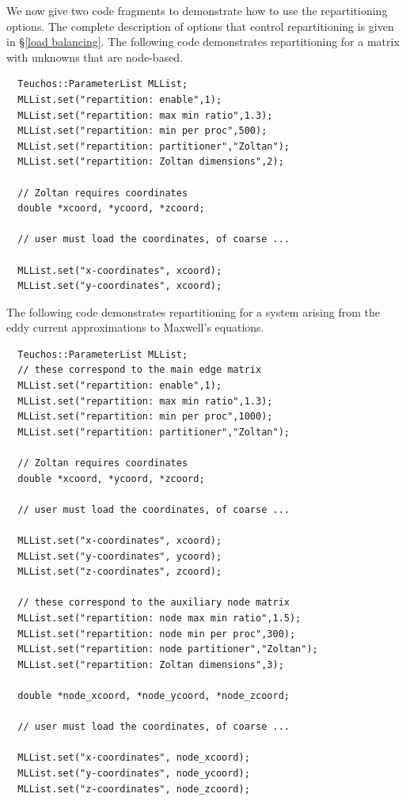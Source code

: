 \documentclass{article}[11pt]
\newcommand{\zoltan}  {{\sc Zoltan}}
\begin{document}
We now give two code fragments to demonstrate how to use the repartitioning
options.
The complete description of options that control repartitioning is given in
\S\ref{load balancing}.
The following code demonstrates repartitioning for a matrix with
unknowns that are node-based.
\begin{verbatim}
  Teuchos::ParameterList MLList;
  MLList.set("repartition: enable",1);
  MLList.set("repartition: max min ratio",1.3);
  MLList.set("repartition: min per proc",500);
  MLList.set("repartition: partitioner","Zoltan");
  MLList.set("repartition: Zoltan dimensions",2);

  // Zoltan requires coordinates
  double *xcoord, *ycoord, *zcoord;

  // user must load the coordinates, of coarse ...

  MLList.set("x-coordinates", xcoord); 
  MLList.set("y-coordinates", xcoord); 
\end{verbatim}

\noindent
The following code demonstrates repartitioning for a system arising from the
eddy current approximations to Maxwell's equations.

\begin{verbatim}
  Teuchos::ParameterList MLList;
  // these correspond to the main edge matrix
  MLList.set("repartition: enable",1);
  MLList.set("repartition: max min ratio",1.3);
  MLList.set("repartition: min per proc",1000);
  MLList.set("repartition: partitioner","Zoltan");

  // Zoltan requires coordinates
  double *xcoord, *ycoord, *zcoord;

  // user must load the coordinates, of coarse ...

  MLList.set("x-coordinates", xcoord); 
  MLList.set("y-coordinates", ycoord); 
  MLList.set("z-coordinates", zcoord); 

  // these correspond to the auxiliary node matrix
  MLList.set("repartition: node max min ratio",1.5);
  MLList.set("repartition: node min per proc",300);
  MLList.set("repartition: node partitioner","Zoltan");
  MLList.set("repartition: Zoltan dimensions",3);

  double *node_xcoord, *node_ycoord, *node_zcoord;

  // user must load the coordinates, of coarse ...

  MLList.set("x-coordinates", node_xcoord); 
  MLList.set("y-coordinates", node_ycoord); 
  MLList.set("z-coordinates", node_zcoord); 

\end{verbatim}
\end{document}

